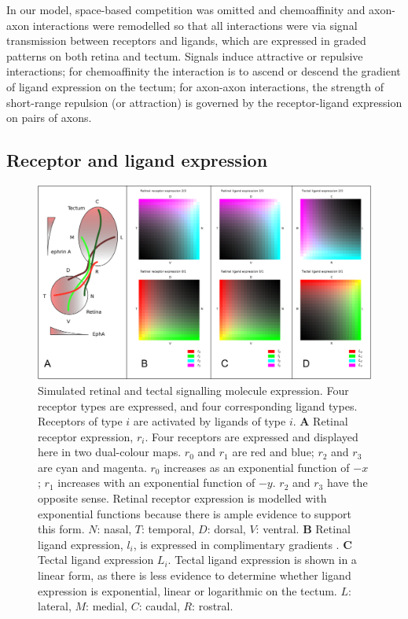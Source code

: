 \documentclass[11pt, a4paper]{article}
\begin{document}
In our model, space-based competition was omitted and chemoaffinity and
axon-axon interactions were remodelled so that all interactions were via
signal transmission between receptors and ligands, which are expressed in
graded patterns on both retina and tectum. Signals induce attractive or
repulsive interactions; for chemoaffinity the interaction is to ascend or
descend the gradient of ligand expression on the tectum; for axon-axon
interactions, the strength of short-range repulsion (or attraction) is
governed by the receptor-ligand expression on pairs of axons.

\subsection*{Receptor and ligand expression}

\begin{figure}
\includegraphics[width=\linewidth]{./images/expressions_fig.png}
\caption{Simulated retinal and tectal signalling molecule expression. Four
receptor types are expressed, and four corresponding ligand types. Receptors
of type $i$ are activated by ligands of type $i$.
%
\textbf{A} Retinal receptor expression, $r_i$. Four receptors are expressed and
displayed here in two dual-colour maps. $r_0$ and $r_1$ are red and blue;
$r_2$ and $r_3$ are cyan and magenta. $r_0$ increases as an exponential
function of $-x$; $r_1$ increases with an exponential function of $-y$. $r_2$
and $r_3$ have the opposite sense. Retinal receptor expression is modelled
with exponential functions because there is ample evidence to support this
form. $N$: nasal, $T$: temporal, $D$: dorsal, $V$: ventral.
%
\textbf{B} Retinal ligand expression, $l_i$, is expressed in complimentary
gradients \citep{hornberger_modulation_1999}.
%
\textbf{C} Tectal ligand expression $L_i$. Tectal ligand expression is shown in a linear form,
as there is less evidence to determine whether ligand expression is
exponential, linear or logarithmic on the tectum.
$L$: lateral, $M$: medial, $C$: caudal, $R$: rostral.
}
\label{f:ex}
\end{figure}
\end{document}
